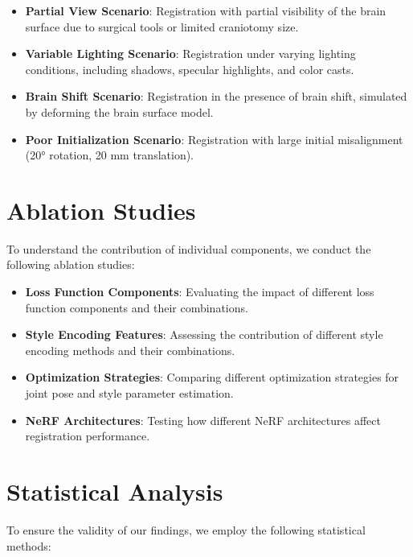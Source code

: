 \begin{itemize}
    \item \textbf{Partial View Scenario}: Registration with partial visibility of the brain surface due to surgical tools or limited craniotomy size.
    
    \item \textbf{Variable Lighting Scenario}: Registration under varying lighting conditions, including shadows, specular highlights, and color casts.
    
    \item \textbf{Brain Shift Scenario}: Registration in the presence of brain shift, simulated by deforming the brain surface model.
    
    \item \textbf{Poor Initialization Scenario}: Registration with large initial misalignment (20° rotation, 20 mm translation).
\end{itemize}

\section{Ablation Studies}

To understand the contribution of individual components, we conduct the following ablation studies:

\begin{itemize}
    \item \textbf{Loss Function Components}: Evaluating the impact of different loss function components and their combinations.
    
    \item \textbf{Style Encoding Features}: Assessing the contribution of different style encoding methods and their combinations.
    
    \item \textbf{Optimization Strategies}: Comparing different optimization strategies for joint pose and style parameter estimation.
    
    \item \textbf{NeRF Architectures}: Testing how different NeRF architectures affect registration performance.
\end{itemize}

\section{Statistical Analysis}

To ensure the validity of our findings, we employ the following statistical methods:

